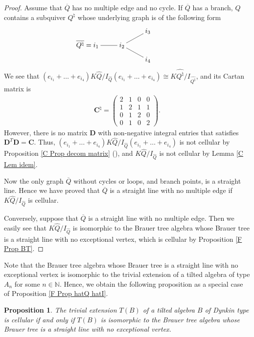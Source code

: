 \documentclass[12pt]{amsart}
\newtheorem{prop}[thm]{Proposition}
\numberwithin{equation}{thm}
\newcommand\NN{\mathbb N}
\newcommand\bC{\mathbf C}
\newcommand\bD{\mathbf D}
\newcommand\wh{\widehat}
\newcommand\ol{\overline}
\newcounter{san}
\newcommand{\roiii}{\roman{san}}
\begin{document}
\begin{proof}
Assume that $\ol{Q}$ has no multiple edge and no cycle. 
If $\ol{Q}$ has a branch, 
$Q$ contains a subquiver $Q^{\natural}$ whose underlying graph is of the following form
\begin{align*}
&\xymatrix@R=5pt{ & & i_3 \\ \ol{Q^{\natural}} = i_1 \ar@{-}[r] & i_2 \ar@{-}[ur] \ar@{-}[dr] & & \\ && i_4}
\end{align*}
We see that 
$(e_{i_1}+ \dots + e_{i_4}) K \wh{Q}/ I_{\wh{Q}} (e_{i_1}+ \dots + e_{i_4}) 
	\cong K \wh{Q^{\natural}}/ I_{\wh{Q^{\natural}}}$, 
and its Cartan matrix is 
\begin{align*}
\bC^{\natural} = 
	\begin{pmatrix} 
	2 & 1 & 0 & 0 
	\\
	1 & 2 & 1 & 1 
	\\
	0 & 1 & 2 & 0 
	\\
	0 & 1 & 0 & 2
	\end{pmatrix}.
\end{align*} 
However, 
there is no matrix $\bD$ with non-negative integral entries that satisfies 
$\bD^T \bD = \bC$. 
Thus, 
$(e_{i_1}+ \dots + e_{i_4}) K \wh{Q}/ I_{\wh{Q}} (e_{i_1}+ \dots + e_{i_4})$ 
is not cellular by Proposition \ref{C Prop decom matrix} (\roiii), and 
$K \wh{Q}/ I_{\wh{Q}}$ is not cellular by Lemma \ref{C Lem idem}. 

Now the only graph $\ol{Q}$ without cycles or loops, 
and branch points, is a straight line. Hence we have proved that 
$\ol{Q}$ is a straight line with no multiple edge if $K \wh{Q} / I_{\wh{Q}}$ is cellular. 

Conversely, suppose that $\ol{Q}$ is a straight line with no multiple edge. Then we easily see that 
$K \wh{Q}/ I_{\wh{Q}}$ is isomorphic to the Brauer tree algebra 
whose Brauer tree is a straight line  
with no exceptional vertex, which is cellular by Proposition \ref{F Prop BT}. 
\end{proof}


Note that 
the Brauer tree algebra whose Brauer tree is a straight line with no exceptional vertex is
isomorphic to the trivial extension of a tilted algebra of type $A_n$ for some $n\in\NN$.
Hence, we obtain the following proposition as a special case of Proposition \ref{F Prop hatQ hatI}. 


\begin{prop} 
\label{F Prop TE}
The trivial extension $T(B)$ of a tilted algebra $B$ of Dynkin type 
is cellular 
if and only if 
$T(B)$ is isomorphic to the Brauer tree algebra whose Brauer tree is 
a straight line with no exceptional vertex.
\end{prop} 
\end{document}
